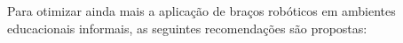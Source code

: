 \documentclass[%
  12pt,%
  a4paper,%
  oneside,%
  openright,%
  sumario = abnt-6027-2012,%
  chapter = TITLE,%
  pretextualoneside,%
  fontetimes,%
  semrecuonosumario,%
  usemakeindex,%
  pardeassinaturas,%
  english,%
  french,%
  spanish,%
  brazil,%
]{utfpr}%
\begin{document}
Para otimizar ainda mais a aplicação de braços robóticos em ambientes educacionais informais, as seguintes recomendações são propostas:














\postextual%



\end{document}

